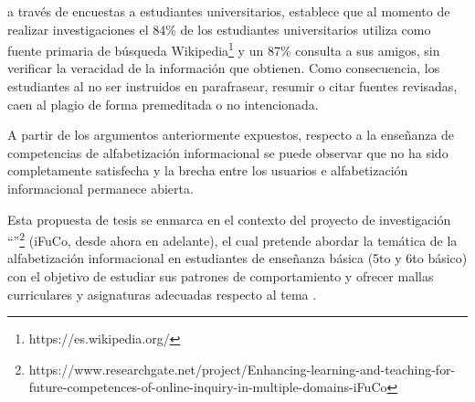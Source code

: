 \textcite[p.~475]{head2013project} a través de encuestas a estudiantes universitarios, establece que al momento de realizar investigaciones el 84\% de los estudiantes universitarios utiliza como fuente primaria de búsqueda Wikipedia\footnote{https://es.wikipedia.org/} y un 87\% consulta a sus amigos, sin verificar la veracidad de la información que obtienen. Como consecuencia, los estudiantes al no ser instruidos en parafrasear, resumir o citar fuentes revisadas, caen al plagio de forma premeditada o no intencionada. 

A partir de los argumentos anteriormente expuestos, respecto a la enseñanza de competencias de alfabetización informacional se puede observar que no ha sido completamente satisfecha y la brecha entre los usuarios e alfabetización informacional permanece abierta.

Esta propuesta de tesis se enmarca en el contexto del proyecto de investigación “”\footnote{https://www.researchgate.net/project/Enhancing-learning-and-teaching-for-future-competences-of-online-inquiry-in-multiple-domains-iFuCo} (iFuCo, desde ahora en adelante), el cual pretende abordar la temática de la alfabetización informacional en estudiantes de enseñanza básica (5to y 6to básico) con el objetivo de estudiar sus patrones de comportamiento y ofrecer mallas curriculares y asignaturas adecuadas respecto al tema \parencite{sormen2017performance}.